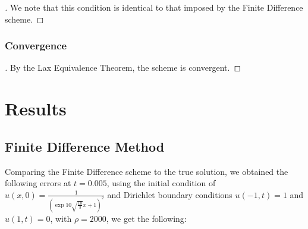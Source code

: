 \documentclass[a4paper]{article}
\begin{document}
\begin{proof}[]
    We note that this condition is identical to that imposed by the Finite Difference scheme.
    	\end{proof}
		\subsubsection{Convergence}
	    \begin{proof}[]
	        By the Lax Equivalence Theorem, the scheme is convergent.
    	\end{proof}
		
\section{Results}\label{sec:results}
	\subsection{Finite Difference Method}
	Comparing the Finite Difference scheme to the true solution, we obtained the following errors at $t=0.005$, using the initial condition of $u(x,0)=\frac{1}{(\exp{10\sqrt{\frac{10}{3}}x}+1)^2}$ and Dirichlet boundary conditions $u(-1, t) = 1$ and $u(1, t) = 0$, with $\rho =2000$, we get the following:
    	
\end{document}
